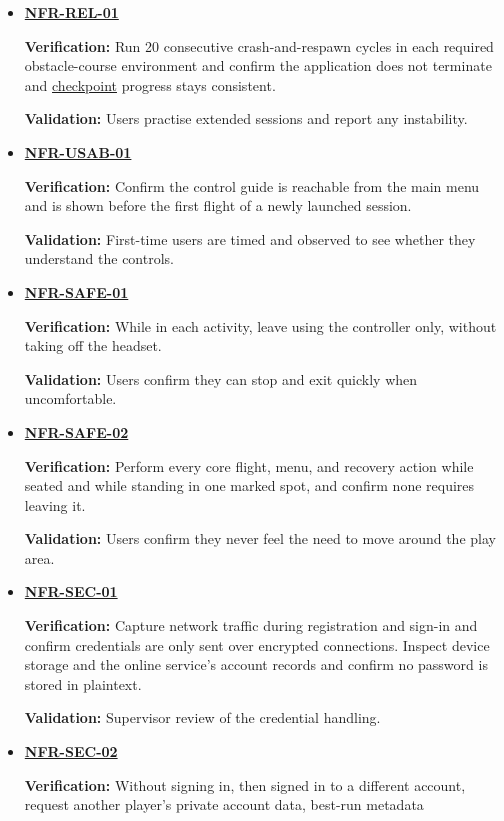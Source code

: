 \documentclass[12pt]{article}
\begin{document}
\begin{itemize}
 \textbf{Validation:} Users report whether the drone responds to the controls
 without noticeable delay.
\item \hyperlink{req:NFR-REL-01}{\textbf{NFR-REL-01}}\par
 \textbf{Verification:} Run 20 consecutive crash-and-respawn cycles in each
 required obstacle-course environment and confirm the application does not
 terminate and \hyperlink{glos:Checkpoint}{checkpoint} progress stays consistent.\par
 \textbf{Validation:} Users practise extended sessions and report any instability.
\item \hyperlink{req:NFR-USAB-01}{\textbf{NFR-USAB-01}}\par
 \textbf{Verification:} Confirm the control guide is reachable from the main
 menu and is shown before the first flight of a newly launched session.\par
 \textbf{Validation:} First-time users are timed and observed to see whether they
 understand the controls.
\item \hyperlink{req:NFR-SAFE-01}{\textbf{NFR-SAFE-01}}\par
 \textbf{Verification:} While in each activity, leave using the controller
 only, without taking off the headset.\par
 \textbf{Validation:} Users confirm they can stop and exit quickly when uncomfortable.
\item \hyperlink{req:NFR-SAFE-02}{\textbf{NFR-SAFE-02}}\par
 \textbf{Verification:} Perform every core flight, menu, and recovery action
 while seated and while standing in one marked spot, and confirm none requires
 leaving it.\par
 \textbf{Validation:} Users confirm they never feel the need to move around
 the play area.
\item \hyperlink{req:NFR-SEC-01}{\textbf{NFR-SEC-01}}\par
 \textbf{Verification:} Capture network traffic during registration and
 sign-in and confirm credentials are only sent over encrypted connections.
 Inspect device storage and the online service's account records and confirm
 no password is stored in plaintext.\par
 \textbf{Validation:} Supervisor review of the credential handling.
\item \hyperlink{req:NFR-SEC-02}{\textbf{NFR-SEC-02}}\par
 \textbf{Verification:} Without signing in, then signed in to a different
 account, request another player's private account data, best-run metadata

\end{itemize}
\end{document}
